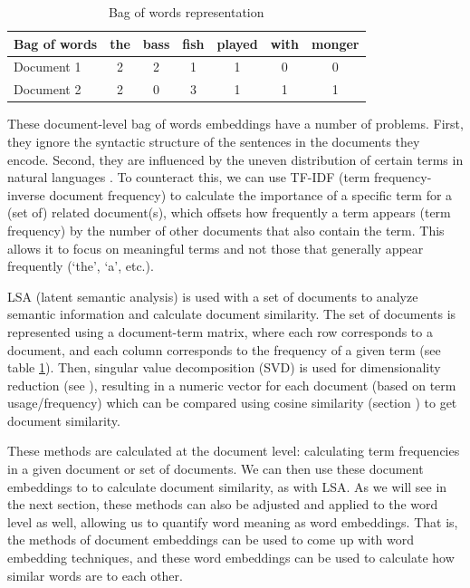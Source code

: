 \begin{table}[h]
    \centering
    \begin{tabular}{|l|c|c|c|c|c|c|}
    \hline
    Bag of words & the & bass & fish & played & with & monger \\
    \hline
    Document 1 & 2 & 2 & 1 & 1 & 0 & 0 \\
    Document 2 & 2 & 0 & 3 & 1 & 1 & 1 \\
    \hline
    \end{tabular}
    \caption{Bag of words representation}
    \label{exampleBags}
\end{table}
These document-level bag of words embeddings have a number of problems. First, they ignore the syntactic structure of the sentences in the documents they encode.  Second, they are influenced by the uneven distribution of certain terms in natural languages \cite{piantadosi2014zipf, zipf1945meaning}. To counteract this, we can use TF-IDF (term frequency-inverse document frequency) to calculate the importance of a specific term for a (set of) related document(s), which offsets how frequently a term appears (term frequency) by the number of other documents that also contain the term. This allows it to focus on meaningful terms and not those that generally appear frequently (`the', `a', etc.). 

LSA (latent semantic analysis) is used with a set of documents to analyze semantic information and calculate document similarity. The set of documents is represented using a document-term matrix, where each row corresponds to a document, and each column corresponds to the frequency of a given term (see table \ref{exampleBags}). Then, singular value decomposition (SVD) is used for dimensionality reduction (see ), resulting in a numeric vector for each document (based on term usage/frequency) which can be compared using cosine similarity (section ) to get document similarity.

These methods are calculated at the document level: calculating term frequencies in a given document or set of documents. We can then use these document embeddings to to calculate document similarity, as with LSA.
As we will see in the next section, these methods can also be adjusted and applied to the word level as well, allowing us to quantify word meaning as word embeddings. That is, the methods of document embeddings can be used to come up with word embedding techniques, and these word embeddings can be used to calculate how similar words are to each other.


